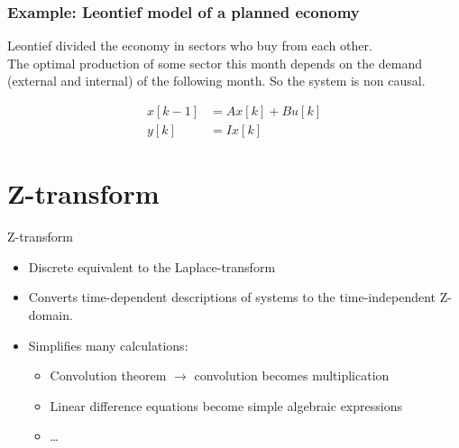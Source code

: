 \begin{frame}
	\frametitle{Example: Leontief model of a planned economy}
	Leontief divided the economy in sectors who buy from each other.\\
	The optimal production of some sector this month depends on the demand (external and internal) of the following month. So the system is non causal.\\
	\begin{center}
		\begin{align*}
			x[k-1] &= A x[k] + B u[k]\\
			y[k] &= I x[k]
		\end{align*}
	\end{center}	
\end{frame}

\section{Z-transform}
\begin{frame}{Z-transform}
	\begin{definition}
		\begin{itemize}
			\item Discrete equivalent to the Laplace-transform
			\item Converts time-dependent descriptions of systems to the time-independent Z-domain.
			\item Simplifies many calculations:
			\begin{itemize}
				\item 	Convolution theorem $\rightarrow$ convolution becomes multiplication
				\item Linear difference equations become simple algebraic expressions
				\item \dots
			\end{itemize}
		\end{itemize}
	\end{definition}
\end{frame}
\begin{frame}
		\begin{figure}
		\end{figure}
		
\end{frame}
